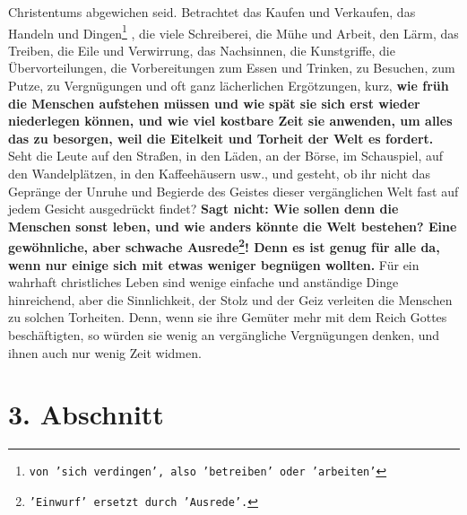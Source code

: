 Christentums abgewichen seid. Betrachtet das Kaufen und Verkaufen, das Handeln
und Dingen\footnote{\texttt{von 'sich verdingen', also 'betreiben' oder
'arbeiten'}}
, die viele Schreiberei, die Mühe und Arbeit, den Lärm, das Treiben,
die Eile und Verwirrung, das Nachsinnen, die Kunstgriffe, die
Übervorteilungen, die Vorbereitungen zum Essen und Trinken, zu Besuchen, zum
Putze, zu Vergnügungen und oft ganz lächerlichen Ergötzungen, kurz, \textbf{wie
früh die
Menschen aufstehen müssen und wie spät sie sich erst wieder niederlegen können,
und wie viel kostbare Zeit sie anwenden, um alles das zu besorgen, weil die
Eitelkeit und Torheit der Welt es fordert.} Seht die Leute auf den Straßen, in
den
Läden, an der Börse, im Schauspiel, auf den Wandelplätzen, in den
Kaffeehäusern usw., und gesteht, ob ihr nicht das Gepränge der Unruhe und
Begierde des Geistes dieser vergänglichen Welt fast auf jedem Gesicht
ausgedrückt findet?
\label{ref:15_02_genug_fuer_alle}
\textbf{Sagt nicht: Wie sollen denn die Menschen sonst leben, und
wie anders könnte die Welt bestehen? Eine gewöhnliche, aber schwache
Ausrede\footnote{\texttt{'Einwurf' ersetzt durch 'Ausrede'.}}!
Denn es ist genug für alle da, wenn nur einige
sich mit
etwas weniger begnügen
wollten.} Für ein wahrhaft christliches Leben sind
wenige
einfache und anständige
Dinge hinreichend, aber die Sinnlichkeit, der Stolz und der Geiz verleiten die
Menschen zu solchen Torheiten. Denn, wenn sie ihre Gemüter mehr mit dem Reich
Gottes beschäftigten, so würden sie wenig an vergängliche Vergnügungen denken,
und ihnen auch nur wenig Zeit widmen.

\section{3. Abschnitt} \label{kap15_ab3}

